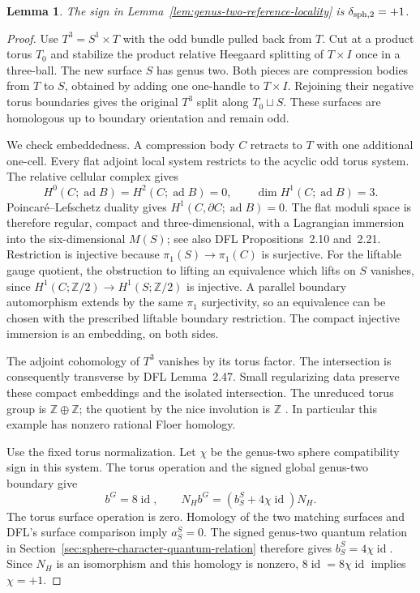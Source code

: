 \documentclass[11pt]{amsart}
\newtheorem{lemma}[theorem]{Lemma}
\theoremstyle{definition}
\theoremstyle{remark}
\theoremstyle{plain}
\newcommand{\id}{\operatorname{id}}
\begin{document}
\begin{lemma}\label{lem:genus-two-reference-calibration}
The sign in Lemma~\ref{lem:genus-two-reference-locality}
is $\delta_{{\rm sph},2}=+1$.
\end{lemma}

\begin{proof}
Use $T^3=S^1\times T$ with the odd bundle pulled
back from $T$. Cut at a product torus $T_0$ and
stabilize the product relative Heegaard splitting
of $T\times I$ once in a three-ball. The new
surface $S$ has genus two. Both pieces are
compression bodies from $T$ to $S$, obtained
by adding one one-handle to $T\times I$.
Rejoining their negative torus boundaries
gives the original $T^3$ split along $T_0\sqcup S$.
These surfaces are homologous up to boundary
orientation and remain odd.

We check embeddedness. A compression body $C$
retracts to $T$ with one additional one-cell.
Every flat adjoint local system restricts to
the acyclic odd torus system. The relative
cellular complex gives
\[
 H^0(C;\operatorname{ad}B)=H^2(C;\operatorname{ad}B)=0,
 \qquad \dim H^1(C;\operatorname{ad}B)=3.
\]
Poincaré--Lefschetz duality gives
$H^1(C,\partial C;\operatorname{ad}B)=0$.
The flat moduli space is therefore regular,
compact and three-dimensional, with a
Lagrangian immersion into the six-dimensional
$M(S)$; see also DFL Propositions~2.10 and~2.21.
Restriction is injective because
$\pi_1(S)\to\pi_1(C)$ is surjective.
For the liftable gauge quotient, the
obstruction to lifting an equivalence
which lifts on $S$ vanishes, since
$H^1(C;\mathbb Z/2)\to H^1(S;\mathbb Z/2)$
is injective. A parallel boundary
automorphism extends by the same
$\pi_1$ surjectivity, so an equivalence
can be chosen with the prescribed
liftable boundary restriction.
The compact injective immersion is
an embedding, on both sides.

The adjoint cohomology of $T^3$ vanishes
by its torus factor. The intersection
is consequently transverse by DFL
Lemma~2.47. Small regularizing data
preserve these compact embeddings and
the isolated intersection. The unreduced
torus group is $\mathbb Z\oplus\mathbb Z$;
the quotient by the nice involution is
$\mathbb Z$
\cite[Section~7.1]{KronheimerMrowka10}.
In particular this example has nonzero
rational Floer homology.

Use the fixed torus normalization. Let
$\chi$ be the genus-two sphere compatibility
sign in this system. The torus operation
and the signed global genus-two boundary give
\[
 b^G=8\id,\qquad
 N_Hb^G=(b_S^S+4\chi\id)N_H.
\]
The torus surface operation is zero.
Homology of the two matching surfaces
and DFL's surface comparison imply
$a_S^S=0$. The signed genus-two quantum
relation in
Section~\ref{sec:sphere-character-quantum-relation}
therefore gives $b_S^S=4\chi\id$.
Since $N_H$ is an isomorphism and this
homology is nonzero, $8\id=8\chi\id$
implies $\chi=+1$.


\end{proof}
\end{document}
